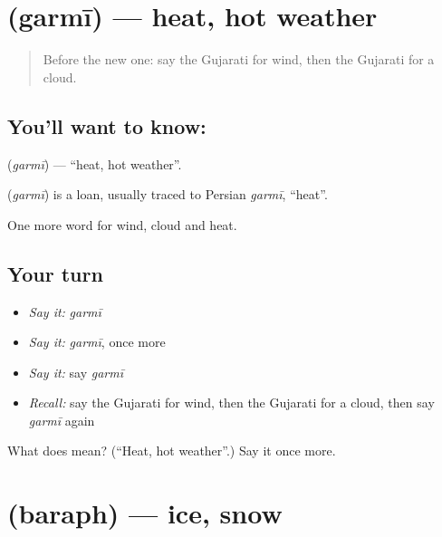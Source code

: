 \section[\texorpdfstring{\gu{ગરમી} (garmī)}{ગરમી (garmī)}]{ (garmī) — heat, hot weather}

\label{lesson:GU-C66-heat}



\begin{quote}
Before the new one: say the Gujarati for wind, then the Gujarati for a cloud.
\end{quote}

\subsection*{You'll want to know: }
\textbf{} (\emph{garmī}) — \textquotedblleft{}heat, hot weather\textquotedblright{}.

\begin{cousinweb}
\textbf{} (\emph{garmī}) is a loan, usually traced to Persian \emph{garmī}, \textquotedblleft{}heat\textquotedblright{}.
\end{cousinweb}

\begin{grammarlens}[title={What you've built}]
One more word for wind, cloud and heat.
\end{grammarlens}

\subsection*{Your turn}
\begin{itemize}
\raggedright
  \item \emph{Say it:} \emph{garmī}
  \item \emph{Say it:} \emph{garmī}, once more
  \item \emph{Say it:} say \emph{garmī}
  \item \emph{Recall:} say the Gujarati for wind, then the Gujarati for a cloud, then say \emph{garmī} again
\end{itemize}

\begin{tcolorbox}[breakable,colback=teal!4,colframe=teal!35!black,title={Before you move on}]
What does  mean? (\textquotedblleft{}Heat, hot weather\textquotedblright{}.) Say it once more.
\end{tcolorbox}
\section[\texorpdfstring{\gu{બરફ} (baraph)}{બરફ (baraph)}]{ (baraph) — ice, snow}

